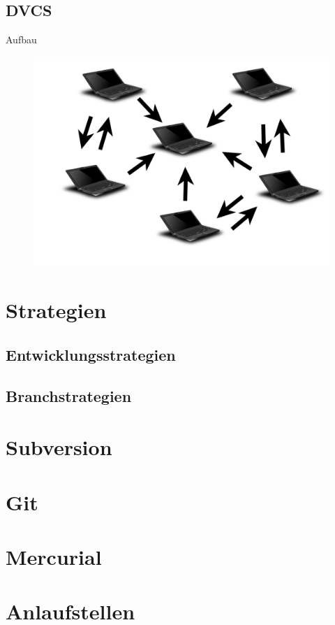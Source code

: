 \documentclass[presentation]{beamer}
\begin{document}
\subsection{DVCS}
\begin{frame}{Aufbau}
  \begin{figure}
    \centering
    \includegraphics[width=\textwidth]{img/dvcs}
  \end{figure}
\end{frame}
\section{Strategien}
\subsection{Entwicklungsstrategien}

\subsection{Branchstrategien}

\section{Subversion}
\section{Git}
\section{Mercurial}

\section{Anlaufstellen}
\end{document}
